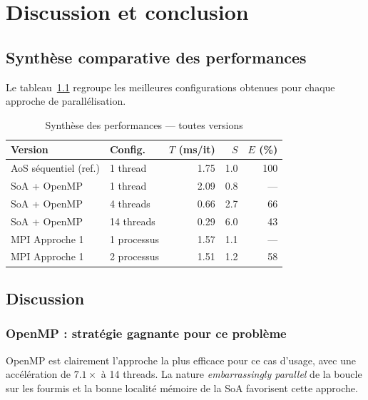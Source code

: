 \chapter{Discussion et conclusion}
\label{chap:discussion}

\section{Synthèse comparative des performances}

Le tableau~\ref{tab:synth} regroupe les meilleures configurations obtenues pour
chaque approche de parallélisation.

\begin{table}[h]
\centering
\caption{Synthèse des performances — toutes versions}
\label{tab:synth}
\begin{tabular}{llrrr}
\hline
\textbf{Version}              & \textbf{Config.}    & \textbf{$T$ (ms/it)} & \textbf{$S$} & \textbf{$E$ (\%)} \\
\hline
AoS séquentiel (ref.)         & 1 thread            & 1.75  & 1.0 & 100 \\
SoA + OpenMP                  & 1 thread            & 2.09  & 0.8 & --- \\
SoA + OpenMP                  & 4 threads           & 0.66  & 2.7 & 66 \\
SoA + OpenMP                  & 14 threads          & 0.29  & 6.0 & 43 \\
MPI Approche 1                & 1 processus         & 1.57  & 1.1 & --- \\
MPI Approche 1                & 2 processus         & 1.51  & 1.2 & 58 \\
\hline
\end{tabular}
\end{table}

\section{Discussion}

\subsection{OpenMP : stratégie gagnante pour ce problème}

OpenMP est clairement l'approche la plus efficace pour ce cas d'usage, avec une
accélération de $7.1\times$ à 14 threads. La nature \emph{embarrassingly parallel}
de la boucle sur les fourmis et la bonne localité mémoire de la SoA favorisent
cette approche.

